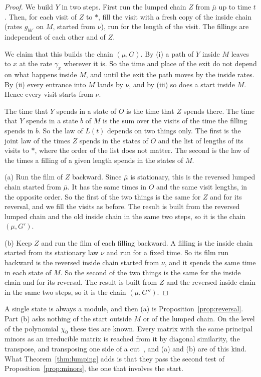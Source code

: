 \documentclass[11pt]{article}
\theoremstyle{definition}
\theoremstyle{remark}
\begin{document}
\begin{proof}
We build $Y$ in two steps. First run the lumped chain $Z$ from $\bar\mu$ up to
time $t$. Then, for each visit of $Z$ to $\ast$, fill the visit with a fresh
copy of the inside chain (rates $g_{bb'}$ on $M$, started from $\nu$), run for
the length of the visit. The fillings are independent of each other and of $Z$.

We claim that this builds the chain $(\mu,G)$. By (i) a path of $Y$ inside $M$
leaves to $x$ at the rate $\gamma_x$ wherever it is. So the time and place of
the exit do not depend on what happens inside $M$, and until the exit the path
moves by the inside rates. By (ii) every entrance into $M$ lands by $\nu$, and
by (iii) so does a start inside $M$. Hence every visit starts from $\nu$.

The time that $Y$ spends in a state of $O$ is the time that $Z$ spends there.
The time that $Y$ spends in a state $b$ of $M$ is the sum over the visits of
the time the filling spends in $b$. So the law of $L(t)$ depends on two things
only. The first is the joint law of the times $Z$ spends in the states of $O$
and the list of lengths of its visits to $\ast$, where the order of the list
does not matter. The second is the law of the times a filling of a given
length spends in the states of $M$.

(a) Run the film of $Z$ backward. Since $\bar\mu$ is stationary, this is the
reversed lumped chain started from $\bar\mu$. It has the same times in $O$ and
the same visit lengths, in the opposite order. So the first of the two things
is the same for $Z$ and for its reversal, and we fill the visits as before.
The result is built from the reversed lumped chain and the old inside chain in
the same two steps, so it is the chain $(\mu,G')$.

(b) Keep $Z$ and run the film of each filling backward. A filling is the
inside chain started from its stationary law $\nu$ and run for a fixed time. So
its film run backward is the reversed inside chain started from $\nu$, and it
spends the same time in each state of $M$. So the second of the two things is
the same for the inside chain and for its reversal. The result is built from
$Z$ and the reversed inside chain in the same two steps, so it is the chain
$(\mu,G'')$.
\end{proof}

A single state is always a module, and then (a) is
Proposition~\ref{prop:reversal}. Part (b) asks nothing of the start outside
$M$ or of the lumped chain. On the level of the polynomial $\chi_0$ these ties
are known. Every matrix with the same principal minors as an irreducible matrix
is reached from it by diagonal similarity, the transpose, and transposing one
side of a cut~\cite{hl1984,alahmadieh2026,cggr2025}, and (a) and (b) are of
this kind. What Theorem~\ref{thm:lumping} adds is that they pass the second test
of Proposition~\ref{prop:minors}, the one that involves the start.
\end{document}
